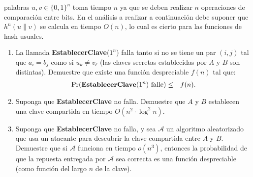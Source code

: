 palabras $u, v \in \{0,1\}^n$ toma tiempo $n$ ya que se deben realizar
$n$ operaciones de comparación entre bits. En el análisis a realizar a
continuación debe suponer que $h^n(u \| v)$ se calcula en tiempo
$O(n)$, lo cual es cierto para las funciones de hash usuales.
\begin{enumerate}
\item La llamada {\bf EstablecerClave}($1^n$) falla tanto si no se tiene un par $(i, j)$ tal que $a_i = b_j$ como si $u_k \neq v_\ell$ (las claves secretas establecidas por $A$ y $B$ son distintas). Demuestre que existe una función despreciable $f(n)$ tal que:
\begin{eqnarray*}
\Pr(\text{{\bf EstablecerClave}($1^n$) falle}) & \leq & f(n).
\end{eqnarray*}

\item Suponga que {\bf EstablecerClave} no falla. Demuestre que $A$ y $B$ establecen una clave compartida en tiempo $O(n^2 \cdot \log^2 n)$.

\item Suponga que {\bf EstablecerClave} no falla, y sea $\mathcal{A}$ un algoritmo aleatorizado que usa un atacante para descubrir la clave compartida entre $A$ y $B$. Demuestre que si $\mathcal{A}$ funciona en tiempo $o(n^3)$, entonces la probabilidad de que la repuesta entregada por $\mathcal{A}$ sea correcta es una función despreciable (como función del largo $n$ de la clave).
\end{enumerate}




